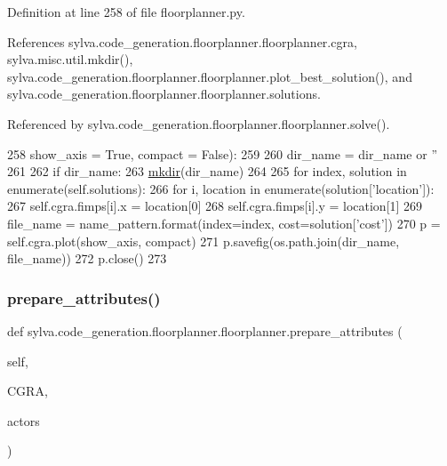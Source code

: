 Definition at line 258 of file floorplanner.\+py.



References sylva.\+code\+\_\+generation.\+floorplanner.\+floorplanner.\+cgra, sylva.\+misc.\+util.\+mkdir(), sylva.\+code\+\_\+generation.\+floorplanner.\+floorplanner.\+plot\+\_\+best\+\_\+solution(), and sylva.\+code\+\_\+generation.\+floorplanner.\+floorplanner.\+solutions.



Referenced by sylva.\+code\+\_\+generation.\+floorplanner.\+floorplanner.\+solve().


\begin{DoxyCode}
258     show\_axis = \textcolor{keyword}{True}, compact = \textcolor{keyword}{False}):
259 
260     dir\_name = dir\_name \textcolor{keywordflow}{or} \textcolor{stringliteral}{''}
261 
262     \textcolor{keywordflow}{if} dir\_name:
263       \hyperlink{namespacesylva_1_1misc_1_1util_af426e429c40209bbb46e3a0e8f139a44}{mkdir}(dir\_name)
264 
265     \textcolor{keywordflow}{for} index, solution \textcolor{keywordflow}{in} enumerate(self.solutions):
266       \textcolor{keywordflow}{for} i, location \textcolor{keywordflow}{in} enumerate(solution[\textcolor{stringliteral}{'location'}]):
267         self.cgra.fimps[i].x = location[0]
268         self.cgra.fimps[i].y = location[1]
269       file\_name = name\_pattern.format(index=index, cost=solution[\textcolor{stringliteral}{'cost'}])
270       p = self.cgra.plot(show\_axis, compact)
271       p.savefig(os.path.join(dir\_name, file\_name))
272       p.close()
273 
\end{DoxyCode}
\mbox{\label{classsylva_1_1code__generation_1_1floorplanner_1_1floorplanner_ab5bba2d11374f0e3fe5199738e01033a}} 
\subsubsection{\texorpdfstring{prepare\+\_\+attributes()}{prepare\_attributes()}}
{\footnotesize\ttfamily def sylva.\+code\+\_\+generation.\+floorplanner.\+floorplanner.\+prepare\+\_\+attributes (\begin{DoxyParamCaption}\item[{}]{self,  }\item[{}]{C\+G\+RA,  }\item[{}]{actors }\end{DoxyParamCaption})}



